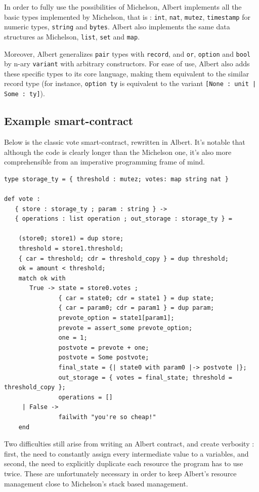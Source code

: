 \documentclass{report}
\begin{document}
In order to fully use the possibilities of Michelson, Albert implements all the basic types implemented by Michelson, that is : \texttt{int}, \texttt{nat}, \texttt{mutez}, \texttt{timestamp} for numeric types, \texttt{string} and \texttt{bytes}. Albert also implements the same data structures as Michelson, \texttt{list}, \texttt{set} and \texttt{map}.
    
Moreover, Albert generalizes \texttt{pair} types with \texttt{record}, and \texttt{or}, \texttt{option} and \texttt{bool} by n-ary \texttt{variant} with arbitrary constructors. For ease of use, Albert also adds these specific types to its core language, making them equivalent to the similar record type (for instance, \texttt{option ty} is equivalent to the variant \texttt{[None : unit | Some : ty]}).

\subsection{Example smart-contract}

Below is the classic vote smart-contract, rewritten in Albert. It's notable that although the code is clearly longer than the Michelson one, it's also more comprehensible from an imperative programming frame of mind.

\lstset{language=albert}
\begin{lstlisting}
type storage_ty = { threshold : mutez; votes: map string nat }

def vote :
   { store : storage_ty ; param : string } ->
   { operations : list operation ; out_storage : storage_ty } =

    (store0; store1) = dup store;
    threshold = store1.threshold;
    { car = threshold; cdr = threshold_copy } = dup threshold;
    ok = amount < threshold;
    match ok with
       True -> state = store0.votes ;
               { car = state0; cdr = state1 } = dup state;
               { car = param0; cdr = param1 } = dup param;
               prevote_option = state1[param1];
               prevote = assert_some prevote_option;
               one = 1;
               postvote = prevote + one;
               postvote = Some postvote;
               final_state = {| state0 with param0 |-> postvote |};
               out_storage = { votes = final_state; threshold = threshold_copy };
               operations = []
     | False ->
               failwith "you're so cheap!"
    end
\end{lstlisting}

Two difficulties still arise from writing an Albert contract, and create verbosity : first, the need to constantly assign every intermediate value to a variables, and second, the need to explicitly duplicate each resource the program has to use twice. These are unfortunately necessary in order to keep Albert's resource management close to Michelson's stack based management.
\end{document}
